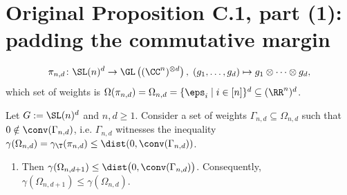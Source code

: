 
















































\appendix\setcounter{section}{2}\section{Original Proposition C.1, part (1): padding the commutative margin}\label{subsec:extension}	\begin{align*}
	\pi_{n,d} \colon \SL(n)^d \to \GL\left( (\CC^n)^{\otimes d} \right), \; (g_1, \ldots, g_d) \mapsto g_1 \otimes \cdots \otimes g_d,
	\end{align*}
which set of weights is $\Omega(\pi_{n,d}) = \Omega_{n,d} = \lbrace \eps_{i} \mid i \in [n] \rbrace^d \subseteq (\RR^n)^d$.

\begin{prp}\label{prp:dTensorsPadding}
Let $G:= \SL(n)^d$ and $n,d \geq 1$. Consider a set of weights $\Gamma_{n,d} \subseteq \Omega_{n,d}$ such that $0 \notin \conv(\Gamma_{n,d})$, i.e. $\Gamma_{n,d}$ witnesses the inequality $\gamma(\Omega_{n,d}) = \gamma_{\T}(\pi_{n,d}) \leq \dist (0, \conv(\Gamma_{n,d}))$.
	\begin{enumerate}
	\item  Then $\gamma(\Omega_{n,d+1}) \leq \dist \big(0, \conv(\Gamma_{n,d}) \big)$. Consequently, $\gamma(\Omega_{n,d+1}) \leq \gamma(\Omega_{n,d})$.

	\end{enumerate}

\end{prp}

